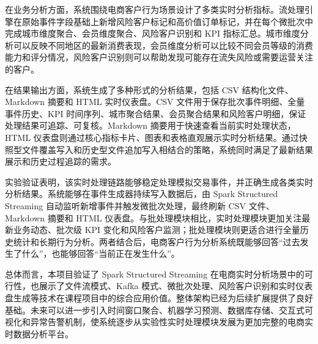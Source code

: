 \documentclass[12pt,hyperref,a4paper,UTF8]{ctexart}
\begin{document}
在业务分析方面，系统围绕电商客户行为场景设计了多类实时分析指标。流处理引擎在原始事件字段基础上新增风险客户标记和高价值订单标记，并在每个微批次中完成城市维度聚合、会员维度聚合、风险客户识别和 KPI 指标汇总。城市维度分析可以反映不同地区的最新消费表现，会员维度分析可以比较不同会员等级的消费能力和评分情况，风险客户识别则可以帮助发现可能存在流失风险或需要运营关注的客户。

在结果输出方面，系统生成了多种形式的分析结果，包括 CSV 结构化文件、Markdown 摘要和 HTML 实时仪表盘。CSV 文件用于保存批次事件明细、全量事件历史、KPI 时间序列、城市聚合结果、会员聚合结果和风险客户明细，保证处理结果可追踪、可复核。Markdown 摘要用于快速查看当前实时处理状态，HTML 仪表盘则通过核心指标卡片、图表和表格直观展示实时分析结果。通过快照型文件覆盖写入和历史型文件追加写入相结合的策略，系统同时满足了最新结果展示和历史过程追踪的需求。

实验验证表明，该实时处理链路能够稳定处理模拟交易事件，并正确生成各类实时分析结果。系统能够在事件生成器持续写入数据后，由 Spark Structured Streaming 自动监听新增事件并触发微批次处理，最终刷新 CSV 文件、Markdown 摘要和 HTML 仪表盘。与批处理模块相比，实时处理模块更加关注最新业务动态、批次级 KPI 变化和风险客户监测；批处理模块则更适合进行全量历史统计和长期行为分析。两者结合后，电商客户行为分析系统既能够回答“过去发生了什么”，也能够回答“当前正在发生什么”。

总体而言，本项目验证了 Spark Structured Streaming 在电商实时分析场景中的可行性，也展示了文件流模式、Kafka 模式、微批次处理、风险客户识别和实时仪表盘生成等技术在课程项目中的综合应用价值。整体架构已经为后续扩展提供了良好基础。未来可以进一步引入时间窗口聚合、机器学习预测、数据库存储、交互式可视化和异常告警机制，使系统逐步从实验性实时处理模块发展为更加完整的电商实时数据分析平台。
\end{document}
